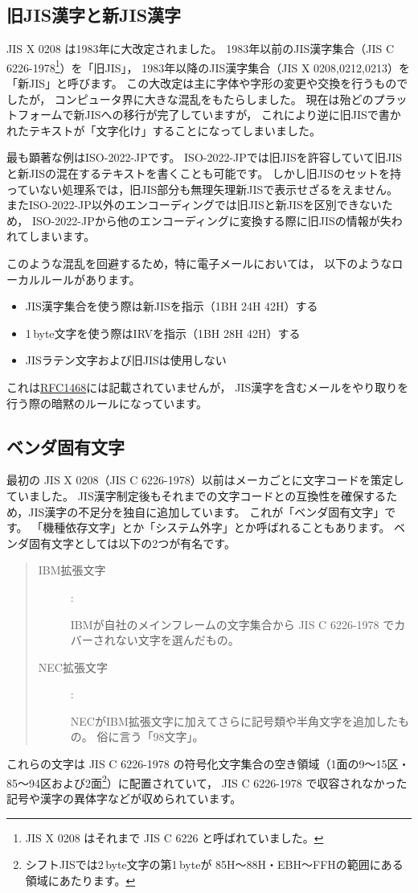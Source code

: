 \documentclass[a4j,10pt,fleqn]{jsarticle}
\begin{document}
\subsection{旧JIS漢字と新JIS漢字}

JIS X 0208 は1983年に大改定されました。
1983年以前のJIS漢字集合（JIS C 6226-1978\footnote{
    JIS X 0208 はそれまで JIS C 6226 と呼ばれていました。
}）を「旧JIS」，
1983年以降のJIS漢字集合（JIS X 0208,0212,0213）を「新JIS」と呼びます。
この大改定は主に字体や字形の変更や交換を行うものでしたが，
コンピュータ界に大きな混乱をもたらしました。
現在は殆どのプラットフォームで新JISへの移行が完了していますが，
これにより逆に旧JISで書かれたテキストが「文字化け」することになってしまいました。

最も顕著な例はISO-2022-JPです。
ISO-2022-JPでは旧JISを許容していて旧JISと新JISの混在するテキストを書くことも可能です。
しかし旧JISのセットを持っていない処理系では，旧JIS部分も無理矢理新JISで表示せざるをえません。
またISO-2022-JP以外のエンコーディングでは旧JISと新JISを区別できないため，
ISO-2022-JPから他のエンコーディングに変換する際に旧JISの情報が失われてしまいます。

このような混乱を回避するため，特に電子メールにおいては，
以下のようなローカルルールがあります。
\begin{itemize}
\item JIS漢字集合を使う際は新JISを指示（1BH 24H 42H）する
\item 1\,byte文字を使う際はIRVを指示（1BH 28H 42H）する
\item JISラテン文字および旧JISは使用しない
\end{itemize}%
これは\href{ftp://ftp.isi.edu/in-notes/rfc1468.txt}{RFC1468}には記載されていませんが，
JIS漢字を含むメールをやり取りを行う際の暗黙のルールになっています。


\subsection{ベンダ固有文字}

最初の JIS X 0208（JIS C 6226-1978）以前はメーカごとに文字コードを策定していました。
JIS漢字制定後もそれまでの文字コードとの互換性を確保するため，JIS漢字の不足分を独自に追加しています。
これが「ベンダ固有文字」です。
「機種依存文字」とか「システム外字」とか呼ばれることもあります。
ベンダ固有文字としては以下の2つが有名です。
\begin{quote}\begin{description}
\item[IBM拡張文字] :\par
    IBMが自社のメインフレームの文字集合から JIS C 6226-1978 でカバーされない文字を選んだもの。
\item[NEC拡張文字] :\par
    NECがIBM拡張文字に加えてさらに記号類や半角文字を追加したもの。
    俗に言う「98文字」。
\end{description}\end{quote}
これらの文字は JIS C 6226-1978 の符号化文字集合の空き領域（1面の9～15区・85～94区および2面\footnote{
    シフトJISでは2\,byte文字の第1\,byteが
    85H～88H・EBH～FFHの範囲にある領域にあたります。
}）に配置されていて，
JIS C 6226-1978 で収容されなかった記号や漢字の異体字などが収められています。
\end{document}
